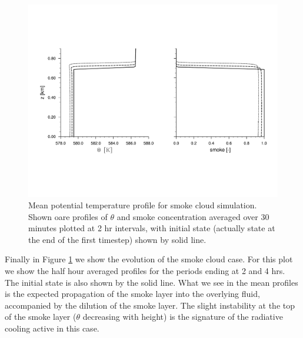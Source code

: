 \documentclass[11pt,a4paper]{article}
\begin{document}
\begin{figure}[htb]
\centering \leavevmode 
\includegraphics[width=12cm]{smoke}
\caption{Mean potential temperature profile for smoke cloud
simulation.  Shown oare profiles of $\theta $ and smoke concentration
averaged over 30 minutes plotted at 2 hr intervals, with initial state
(actually state at the end of the first timestep) shown by solid
line.}
\label{fig:smoke}
\end{figure}

Finally in Figure \ref{fig:smoke} we show the evolution of the smoke
cloud case.  For this plot we show the half hour averaged profiles for
the periods ending at 2 and 4 hrs.  The initial state is also shown by
the solid line.  What we see in the mean profiles is the expected
propagation of the smoke layer into the overlying fluid, accompanied
by the dilution of the smoke layer.  The slight instability at the top
of the smoke layer ($\theta$ decreasing with height) is the signature
of the radiative cooling active in this case.


\end{document}
